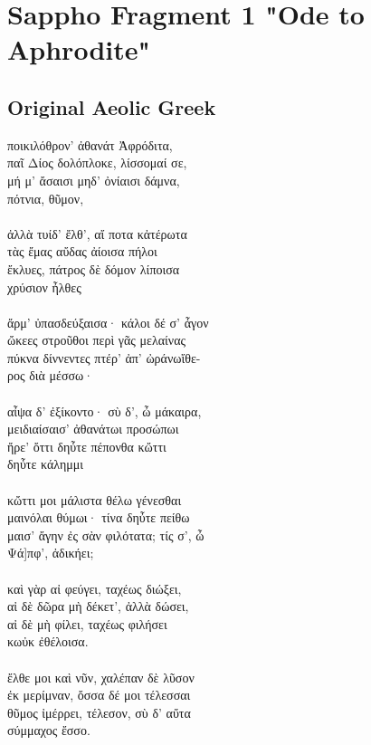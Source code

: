 
\section*{Sappho Fragment 1 "Ode to Aphrodite"}
\begin{multicols}{2}
  \subsection*{Original Aeolic Greek}
  ποικιλόθρον' ἀθανάτ Ἀφρόδιτα,\\
  παῖ Δίος δολόπλοκε, λίσσομαί σε,\\
  μή μ' ἄσαισι μηδ' ὀνίαισι δάμνα,\\
  πότνια, θῦμον,\\
  \\
  ἀλλὰ τυίδ' ἔλθ', αἴ ποτα κἀτέρωτα\\
  τὰς ἔμας αὔδας ἀίοισα πήλοι\\
  ἔκλυες, πάτρος δὲ δόμον λίποισα\\
  χρύσιον ἦλθες\\
  \\
  ἄρμ' ὐπασδεύξαισα· κάλοι δέ σ' ἆγον\\
  ὤκεες στροῦθοι περὶ γᾶς μελαίνας\\
  πύκνα δίννεντες πτέρ' ἀπ' ὠράνωἴθε-\\
  ρος διὰ μέσσω·\\
  \\
  αἶψα δ' ἐξίκοντο· σὺ δ', ὦ μάκαιρα,\\
  μειδιαίσαισ' ἀθανάτωι προσώπωι\\
  ἤρε' ὄττι δηὖτε πέπονθα κὤττι\\
  δηὖτε κάλημμι\\
  \\
  κὤττι μοι μάλιστα θέλω γένεσθαι\\
  μαινόλαι θύμωι· τίνα δηὖτε πείθω\\
  μαισ' ἄγην ἐς σὰν φιλότατα; τίς σ', ὦ\\
  Ψά]πφ', ἀδικήει;\\
  \\
  καὶ γὰρ αἰ φεύγει, ταχέως διώξει,\\
  αἰ δὲ δῶρα μὴ δέκετ', ἀλλὰ δώσει,\\
  αἰ δὲ μὴ φίλει, ταχέως φιλήσει\\
  κωὐκ ἐθέλοισα.\\
  \\
  ἔλθε μοι καὶ νῦν, χαλέπαν δὲ λῦσον\\
  ἐκ μερίμναν, ὄσσα δέ μοι τέλεσσαι\\
  θῦμος ἰμέρρει, τέλεσον, σὺ δ' αὔτα\\
  σύμμαχος ἔσσο.


\end{multicols}
